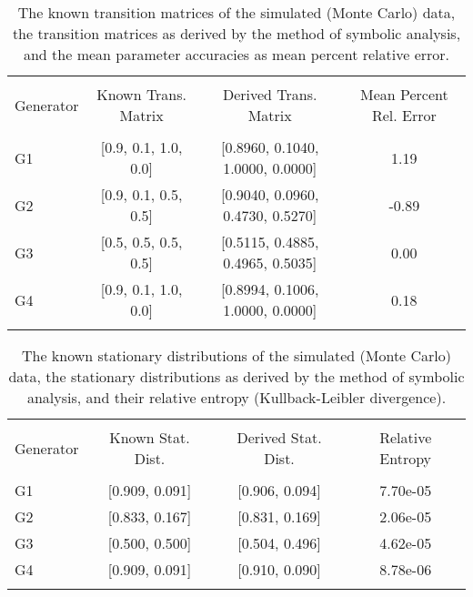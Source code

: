 \documentclass[letter,11pt]{article}
\begin{document}
\begin{table}[!htbp] \centering 
  \caption{The known transition matrices of the simulated (Monte Carlo) data, the transition matrices as derived by the method of symbolic analysis, and the mean parameter accuracies as mean percent relative error.} 
  \label{} 
\begin{tabular}{@{\extracolsep{5pt}}lccc} 
\\[-1.8ex]\hline 
\hline \\[-1.8ex] 
Generator & \multicolumn{1}{c}{Known Trans. Matrix} & \multicolumn{1}{c}{Derived Trans. Matrix} & \multicolumn{1}{c}{Mean Percent Rel. Error}\\
\hline \\[-1.8ex]
G1 & [0.9, 0.1, 1.0, 0.0] & [0.8960, 0.1040, 1.0000, 0.0000] & 1.19\\
G2 & [0.9, 0.1, 0.5, 0.5] & [0.9040, 0.0960, 0.4730, 0.5270] & -0.89\\
G3 & [0.5, 0.5, 0.5, 0.5] & [0.5115, 0.4885, 0.4965, 0.5035] & 0.00\\
G4 & [0.9, 0.1, 1.0, 0.0] & [0.8994, 0.1006, 1.0000, 0.0000] & 0.18\\
\hline \\[-1.8ex]
\end{tabular} 
\end{table}

\begin{table}[!htbp] \centering 
  \caption{The known stationary distributions of the simulated (Monte Carlo) data, the stationary distributions as derived by the method of symbolic analysis, and their relative entropy (Kullback-Leibler divergence).} 
  \label{} 
\begin{tabular}{@{\extracolsep{5pt}}lccc} 
\\[-1.8ex]\hline 
\hline \\[-1.8ex] 
Generator & \multicolumn{1}{c}{Known Stat. Dist.} & \multicolumn{1}{c}{Derived Stat. Dist.} & \multicolumn{1}{c}{Relative Entropy}\\
\hline \\[-1.8ex]
G1 & [0.909, 0.091] & [0.906, 0.094]  & 7.70e-05\\
G2 & [0.833, 0.167] & [0.831, 0.169] & 2.06e-05\\
G3 & [0.500, 0.500] & [0.504, 0.496] & 4.62e-05\\
G4 & [0.909, 0.091] & [0.910, 0.090] & 8.78e-06\\
\hline \\[-1.8ex]
\end{tabular} 
\end{table}
\end{document}
